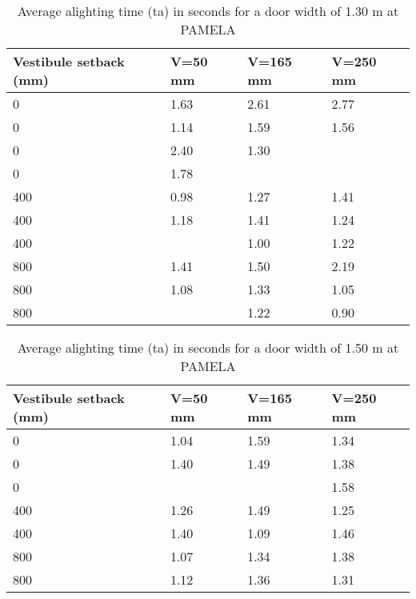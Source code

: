 \begin{table}
  \centering
  \begin{tabular}{llll}
    \toprule
    Vestibule setback (mm) & V=50 mm & V=165 mm & V=250 mm \\
    \midrule
        0 & 1.63 & 2.61 & 2.77  \\
        0 & 1.14 & 1.59 & 1.56  \\
		0 & 2.40 & 1.30 &       \\
		0 & 1.78 &      &       \\
		400 & 0.98 & 1.27 & 1.41  \\
		400 & 1.18 & 1.41 & 1.24  \\
		400 &      & 1.00 & 1.22  \\
		800 & 1.41 & 1.50 & 2.19  \\
		800 & 1.08 & 1.33 & 1.05  \\
		800 &      & 1.22 & 0.90  \\
	\bottomrule
  \end{tabular}
  \caption{Average alighting time (ta) in seconds for a door width of 1.30 m at PAMELA}
  \label{tab:4} %
\end{table}

\begin{table}
  \centering
  \begin{tabular}{llll}
    \toprule
    Vestibule setback (mm) & V=50 mm & V=165 mm & V=250 mm \\
    \midrule
        0 & 1.04 & 1.59 & 1.34  \\
        0 & 1.40 & 1.49 & 1.38  \\
		0 &      &      & 1.58  \\
		400 & 1.26 & 1.49 & 1.25  \\
		400 & 1.40 & 1.09 & 1.46  \\
		800 & 1.07 & 1.34 & 1.38  \\
		800 & 1.12 & 1.36 & 1.31  \\
	\bottomrule
  \end{tabular}
  \caption{Average alighting time (ta) in seconds for a door width of 1.50 m at PAMELA}
  \label{tab:5} %
\end{table}

